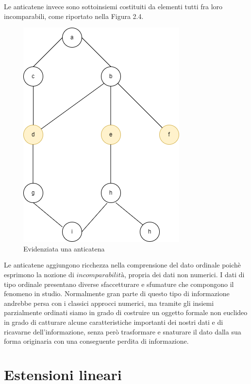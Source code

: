\documentclass[a4paper,12pt, openright]{report}
\begin{document}
Le anticatene invece sono sottoinsiemi costituiti da elementi tutti fra loro incomparabili, come riportato nella Figura 2.4. \\
\begin{figure}[H]
    \centering
    \includegraphics[scale=.5]{ant_catena.png}
    \caption{Evidenziata una anticatena}
\end{figure}

Le anticatene aggiungono ricchezza nella comprensione del dato ordinale poichè esprimono la nozione di $\textit{incomparabilità}$, propria 
dei dati non numerici. I dati di tipo ordinale presentano diverse sfaccetturare e sfumature che compongono il fenomeno in studio. Normalmente gran parte 
di questo tipo di informazione andrebbe persa con i classici approcci numerici, ma tramite gli insiemi parzialmente 
ordinati siamo in grado di costruire un oggetto formale non euclideo in grado di catturare alcune caratteristiche importanti 
dei nostri dati e di ricavarne dell'informazione, senza però trasformare e snaturare il dato dalla sua forma originaria con una conseguente
perdita di informazione.\\

\section{Estensioni lineari}
\end{document}
